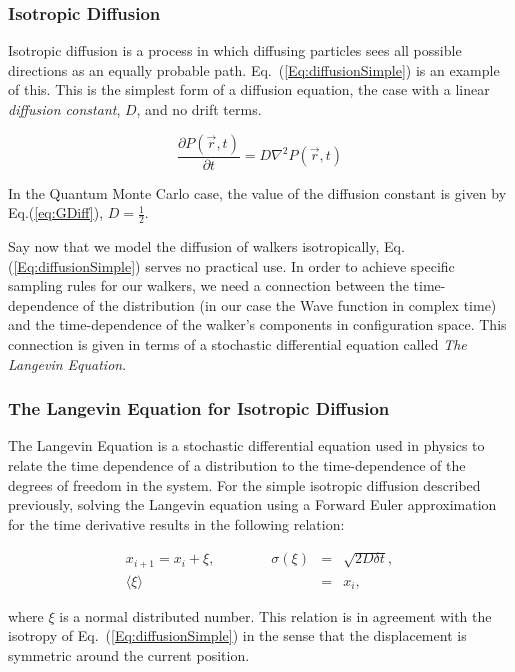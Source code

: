 \subsubsection{Isotropic Diffusion}

Isotropic diffusion is a process in which diffusing particles sees all possible directions as an equally probable path. Eq.~(\ref{Eq:diffusionSimple}) is an example of this. This is the simplest form of a diffusion equation, the case with a linear \textit{diffusion constant}, $D$, and no drift terms.

\begin{equation}
 \frac{\partial P(\vec r, t)}{\partial t} = D\nabla^2 P(\vec r, t) 
 \label{Eq:diffusionSimple}
\end{equation}

In the Quantum Monte Carlo case, the value of the diffusion constant is given by Eq.(\ref{eq:GDiff}), $D=\frac{1}{2}$. 

Say now that we model the diffusion of walkers isotropically, Eq.(\ref{Eq:diffusionSimple}) serves no practical use. In order to achieve specific sampling rules for our walkers, we need a connection between the time-dependence of the distribution (in our case the Wave function in complex time) and the time-dependence of the walker's components in configuration space. This connection is given in terms of a stochastic differential equation called \textit{The Langevin Equation}.

\subsubsection{The Langevin Equation for Isotropic Diffusion}

The Langevin Equation is a stochastic differential equation used in physics to relate the time dependence of a distribution to the time-dependence of the degrees of freedom in the system. For the simple isotropic diffusion described previously, solving the Langevin equation using a Forward Euler approximation for the time derivative results in the following relation:

\begin{eqnarray}
 x_{i+1} = x_i + \xi, \qquad\qquad \sigma(\xi) &=& \sqrt{2D\delta t}, \\
			     \langle\xi\rangle &=& x_i, \nonumber
\end{eqnarray}

where $\xi$ is a normal distributed number. This relation is in agreement with the isotropy of Eq.~(\ref{Eq:diffusionSimple}) in the sense that the displacement is symmetric around the current position.


